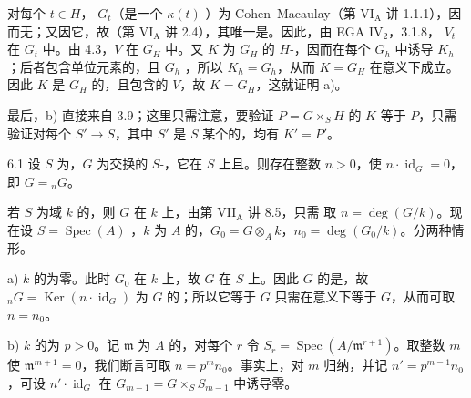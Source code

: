 对每个 $t\in H$， $G_t$（是一个 $\kappa(t)$-）为 Cohen--Macaulay（第 VI$_{\mathrm A}$ 讲 1.1.1），因而无；又因它，故（第 VI$_{\mathrm A}$ 讲 2.4），其唯一是。因此，由 EGA IV$_2$，3.1.8， $V_t$ 在 $G_t$ 中。由 4.3，$V$ 在 $G_H$ 中。又 $K$ 为 $G_H$ 的 $H$-，因而在每个 $G_h$ 中诱导 $K_h$；后者包含单位元素的，且 $G_h$ ，所以 $K_h=G_h$，从而 $K=G_H$ 在意义下成立。因此 $K$ 是 $G_H$ 的，且包含的 $V$，故 $K=G_H$，这就证明 a)。

最后，b) 直接来自 3.9；这里只需注意，要验证 $P=G\times_S H$ 的 $K$ 等于 $P$，只需验证对每个 $S'\to S$，其中 $S'$ 是 $S$ 某个的，均有 $K'=P'$。
\begin{SGAresult}{}{6.1}
设 $S$ 为，$G$ 为交换的 $S$-，它在 $S$ 上且。则存在整数 $n>0$，使 $n\cdot\operatorname{id}_G=0$，即 $G={}_nG$。
\end{SGAresult}
若 $S$ 为域 $k$ 的，则 $G$ 在 $k$ 上，由第 VII$_{\mathrm A}$ 讲 8.5，只需
取 $n=\deg(G/k)$。现在设 $S=\operatorname{Spec}(A)$ ，$k$ 为 $A$ 的，$G_0=G\otimes_A k$，$n_0=\deg(G_0/k)$。分两种情形。

a) $k$ 的为零。此时 $G_0$ 在 $k$ 上，故 $G$ 在 $S$ 上。因此 $G$ 的是，故 ${}_nG=\operatorname{Ker}(n\cdot\operatorname{id}_G)$ 为 $G$ 的；所以它等于 $G$ 只需在意义下等于 $G$，从而可取 $n=n_0$。

b) $k$ 的为 $p>0$。记 $\mathfrak m$ 为 $A$ 的，对每个 $r$ 令 $S_r=\operatorname{Spec}(A/\mathfrak m^{r+1})$。取整数 $m$ 使 $\mathfrak m^{m+1}=0$，我们断言可取 $n=p^mn_0$。事实上，对 $m$ 归纳，并记 $n'=p^{m-1}n_0$，可设 $n'\cdot\operatorname{id}_G$ 在 $G_{m-1}=G\times_S S_{m-1}$ 中诱导零。

